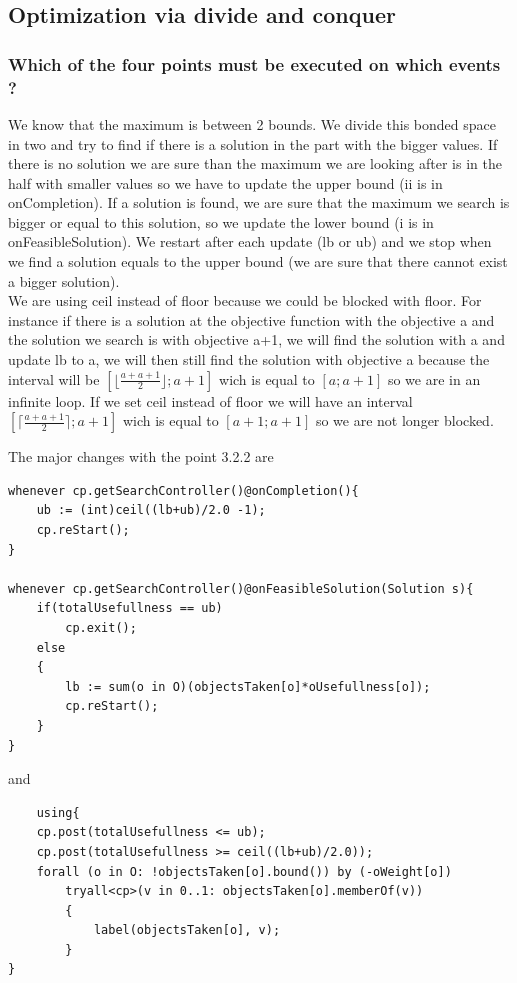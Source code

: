 \documentclass{eplDoc}
\begin{document}
\subsection{Optimization via divide and conquer} %
\subsubsection{Which of the four points must be executed on which events ?}
We know that the maximum is between 2 bounds.  We divide this bonded space in two and try to find if there is a solution in the part with the bigger values.  If there is no solution we are sure than the maximum we are looking after is in the half with smaller values so we have to update the upper bound (ii is in onCompletion).  If a solution is found, we are sure that the maximum we search is bigger or equal to this solution, so we update the lower bound (i is in onFeasibleSolution). We restart after each update (lb or ub) and we stop when we find a solution equals to the upper bound (we are sure that there cannot exist a bigger solution).\\
We are using ceil instead of floor because we could be blocked with floor.  For instance if there is a solution at the objective function with the objective a and the solution we search is with objective a+1, we will find the solution with a and update lb to a, we will then still find the solution with objective a because the interval will be $\left[ \lfloor \frac{a+a+1}2 \rfloor; a+1 \right]$ wich is equal to $\left[ a ; a+1 \right]$ so we are in an infinite loop.  If we set ceil instead of floor we will have an interval $\left[ \lceil \frac{a+a+1}2 \rceil; a+1 \right]$ wich is equal to $\left[ a+1 ; a+1 \right]$ so we are not longer blocked.

The major changes with the point 3.2.2 are
\begin{lstlisting}
whenever cp.getSearchController()@onCompletion(){
    ub := (int)ceil((lb+ub)/2.0 -1);
    cp.reStart();
}

whenever cp.getSearchController()@onFeasibleSolution(Solution s){
    if(totalUsefullness == ub)
        cp.exit();
    else
    {
        lb := sum(o in O)(objectsTaken[o]*oUsefullness[o]);
        cp.reStart();
    }
}
\end{lstlisting}
and 
\begin{lstlisting}
    using{
    cp.post(totalUsefullness <= ub);
    cp.post(totalUsefullness >= ceil((lb+ub)/2.0));
    forall (o in O: !objectsTaken[o].bound()) by (-oWeight[o])
        tryall<cp>(v in 0..1: objectsTaken[o].memberOf(v))
        {
            label(objectsTaken[o], v);
        } 
}
\end{lstlisting}
\end{document}
